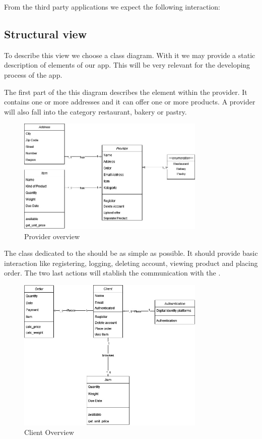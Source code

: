From the third party applications we expect the following interaction:




\subsection{Structural view}
To describe this view we choose a \gls{class diagram}. With it we may provide a static description of elements
of our app. This will be very relevant for the developing process of the \gls{app}.

The first part of the this diagram describes the element within the \gls{provider}. It contains one or more addresses and it 
can offer one or more products. A provider will also fall into the category restaurant, bakery or pastry.

\begin{figure}[H]
    \centering
    \includegraphics[width=0.8\textwidth]{assets/Provider_Addr_Item.jpg}
    \caption{Provider overview}
    \label{fig:Provider_addr_item}
\end{figure}
 
The class dedicated to the  should be as simple as possible. It should provide basic interaction like
registering, logging, deleting account, viewing product and placing order. The two last actions will stablish the communication 
with the .

\begin{figure}[H]
    \centering
    \includegraphics[width=0.8\textwidth]{assets/client_CD.jpg}
    \caption{Client Overview}
    \label{fig:client_CD}
\end{figure}

